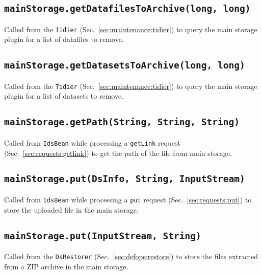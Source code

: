 \documentclass[paper=a4]{scrartcl}
\begin{document}
\subsection{\texttt{mainStorage.getDatafilesToArchive(long, long)}}

Called from the \texttt{Tidier} (Sec.~\ref{sec:maintenance:tidier}) to
query the main storage plugin for a list of datafiles to remove.

\subsection{\texttt{mainStorage.getDatasetsToArchive(long, long)}}

Called from the \texttt{Tidier} (Sec.~\ref{sec:maintenance:tidier}) to
query the main storage plugin for a list of datasets to remove.

\subsection{\texttt{mainStorage.getPath(String, String, String)}}

Called from \texttt{IdsBean} while processing a \texttt{getLink}
request (Sec.~\ref{sec:requests:getlink}) to get the path of the file
from main storage.

\subsection{\texttt{mainStorage.put(DsInfo, String, InputStream)}}

Called from \texttt{IdsBean} while processing a \texttt{put} request
(Sec.~\ref{sec:requests:put}) to store the uploaded file in the main
storage.

\subsection{\texttt{mainStorage.put(InputStream, String)}}

Called from the \texttt{DsRestorer} (Sec.~\ref{sec:defops:restore})
to store the files extracted from a ZIP archive in the main storage.
\end{document}
